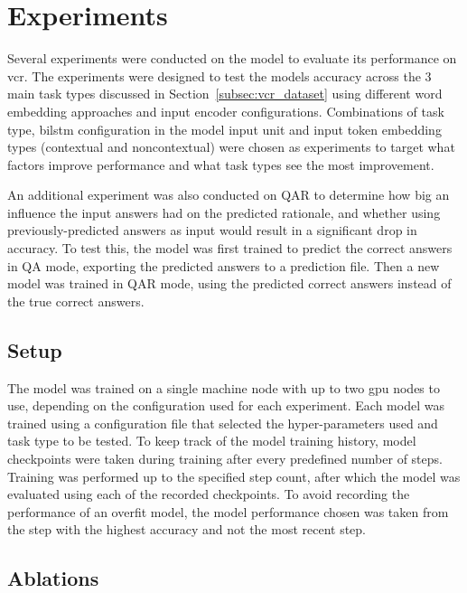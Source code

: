 \section{Experiments}
\label{sec:experiments}

Several experiments were conducted on the model to evaluate its performance on \gls{vcr}.
The experiments were designed to test the models accuracy across the 3 main task types discussed in Section~\ref{subsec:vcr_dataset} using different word embedding approaches and input encoder configurations.
Combinations of task type, \gls{bilstm} configuration in the model input unit and input token embedding types (contextual and noncontextual) were chosen as experiments to target what factors improve performance and what task types see the most improvement.

An additional experiment was also conducted on QA\rightarrow{}R to determine how big an influence the input answers had on the predicted rationale, and whether using previously-predicted answers as input would result in a significant drop in accuracy.
To test this, the model was first trained to predict the correct answers in Q\rightarrow{}A mode, exporting the predicted answers to a prediction file.
Then a new model was trained in QA\rightarrow{}R mode, using the predicted correct answers instead of the true correct answers.

\subsection{Setup}
\label{subsec:experiment-setup}

The model was trained on a single machine node with up to two \acrshort{gpu} nodes to use, depending on the configuration used for each experiment.
Each model was trained using a configuration file that selected the hyper-parameters used and task type to be tested.
To keep track of the model training history, model checkpoints were taken during training after every predefined number of steps.
Training was performed up to the specified step count, after which the model was evaluated using each of the recorded checkpoints.
To avoid recording the performance of an overfit model, the model performance chosen was taken from the step with the highest accuracy and not the most recent step.

\subsection{Ablations}
\label{subsec:experiment-ablations}

